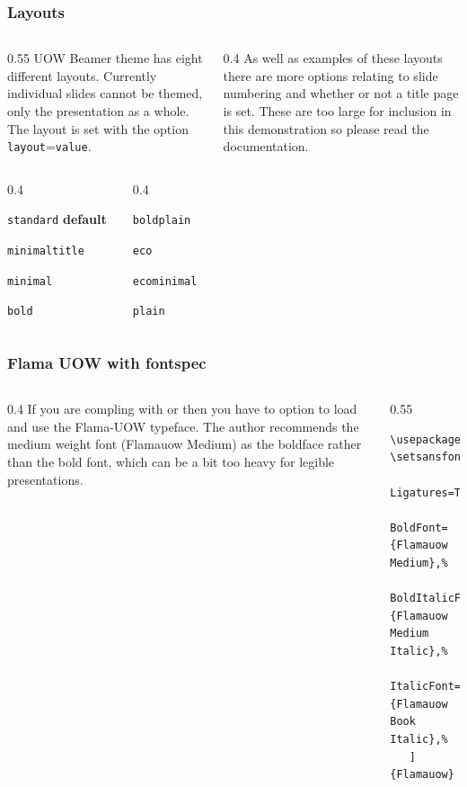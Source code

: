 \documentclass[aspectratio=169]{beamer}
\newcommand{\key}[1]{\texttt{\color{UOWorange}#1}}
\newcommand{\val}[1]{\texttt{\color{UOWblue}#1}}
\begin{document}
\begin{frame}
\frametitle{Layouts}
\begin{columns}[T]
\begin{column}{0.55\textwidth}
UOW Beamer theme has eight different layouts. Currently individual slides cannot be themed, only the presentation as a whole. The layout is set with the option \key{layout}=\val{value}.
\begin{itemize}
   \begin{columns}[T]
   \begin{column}{0.4\textwidth}
   \item \val{standard} \textbf{default}
   \item \val{minimaltitle}
   \item \val{minimal}
   \item \val{bold}
   \end{column}
   \begin{column}{0.4\textwidth}
   \item \val{boldplain}
   \item \val{eco}
   \item \val{ecominimal}
   \item \val{plain}
   \end{column}
   \end{columns}
\end{itemize}
\end{column}

\begin{column}{0.4\textwidth}
As well as examples of these layouts there are more options relating to slide numbering and whether or not a title page is set. These are too large for inclusion in this demonstration so please read the documentation.
\end{column}
\end{columns}
\end{frame}


\begin{frame}[fragile]
\frametitle{Flama UOW with fontspec}
\begin{columns}[T]
\begin{column}{0.4\textwidth}
If you are compling with \XeLaTeX{} or \LuaLaTeX{} then you have to option to load and use the Flama-UOW typeface. The author recommends the medium weight font (Flamauow Medium) as the boldface rather than the bold font, which can be a bit too heavy for legible presentations. 
\end{column}
\begin{column}{0.55\textwidth}
\begin{lstlisting}
\usepackage{fontspec}
\setsansfont[%
   Ligatures=TeX,%
   BoldFont={Flamauow Medium},%
   BoldItalicFont={Flamauow Medium Italic},%
   ItalicFont={Flamauow Book Italic},%
   ]{Flamauow}
\end{lstlisting}
\end{column}
\end{columns}
\end{frame}
\end{document}
